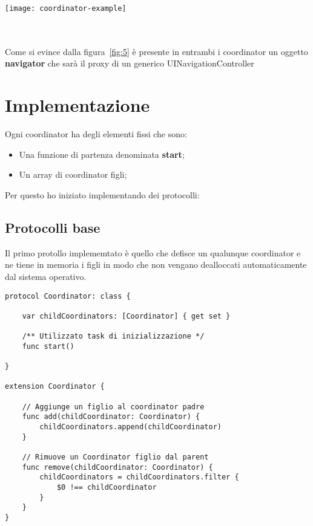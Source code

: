 \begin{minipage}{\linewidth}
    \centering
    \texttt{[image: coordinator-example]}
    \label{fig:5}
\end{minipage}\\ \\

Come si evince dalla figura~\ref{fig:5} è presente in entrambi i coordinator un oggetto
\textbf{navigator} che sarà il proxy di un generico UINavigationController

\section{Implementazione}

Ogni coordinator ha degli elementi fissi che sono:

\begin{itemize}
    \item Una funzione di partenza denominata \textbf{start};
    \item Un array di coordinator figli;
\end{itemize}

Per questo ho iniziato implementando dei protocolli:
\subsection{Protocolli base}

Il primo protollo implememtato è quello che defisce un qualunque coordinator
e ne tiene in memoria i figli in modo che non vengano
dealloccati automaticamente dal sistema operativo.

\begin{verbatim}
protocol Coordinator: class {

    var childCoordinators: [Coordinator] { get set }
    
    /** Utilizzato task di inizializzazione */
    func start()
    
}

extension Coordinator {
    
    // Aggiunge un figlio al coordinator padre
    func add(childCoordinator: Coordinator) {
        childCoordinators.append(childCoordinator)
    }
    
    // Rimuove un Coordinator figlio dal parent
    func remove(childCoordinator: Coordinator) {
        childCoordinators = childCoordinators.filter {
            $0 !== childCoordinator 
        }
    }
}
\end{verbatim}


